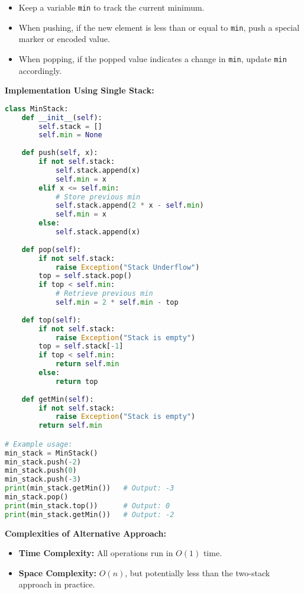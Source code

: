 \begin{itemize}
    \item Keep a variable \texttt{min} to track the current minimum.
    \item When pushing, if the new element is less than or equal to \texttt{min}, push a special marker or encoded value.
    \item When popping, if the popped value indicates a change in \texttt{min}, update \texttt{min} accordingly.
\end{itemize}

\textbf{Implementation Using Single Stack:}

\begin{fullwidth}
\begin{lstlisting}[language=Python]
class MinStack:
    def __init__(self):
        self.stack = []
        self.min = None
    
    def push(self, x):
        if not self.stack:
            self.stack.append(x)
            self.min = x
        elif x <= self.min:
            # Store previous min
            self.stack.append(2 * x - self.min)
            self.min = x
        else:
            self.stack.append(x)
    
    def pop(self):
        if not self.stack:
            raise Exception("Stack Underflow")
        top = self.stack.pop()
        if top < self.min:
            # Retrieve previous min
            self.min = 2 * self.min - top
    
    def top(self):
        if not self.stack:
            raise Exception("Stack is empty")
        top = self.stack[-1]
        if top < self.min:
            return self.min
        else:
            return top
    
    def getMin(self):
        if not self.stack:
            raise Exception("Stack is empty")
        return self.min

# Example usage:
min_stack = MinStack()
min_stack.push(-2)
min_stack.push(0)
min_stack.push(-3)
print(min_stack.getMin())   # Output: -3
min_stack.pop()
print(min_stack.top())      # Output: 0
print(min_stack.getMin())   # Output: -2
\end{lstlisting}
\end{fullwidth}

\textbf{Complexities of Alternative Approach:}

\begin{itemize}
    \item \textbf{Time Complexity:} All operations run in \(O(1)\) time.
    \item \textbf{Space Complexity:} \(O(n)\), but potentially less than the two-stack approach in practice.
\end{itemize}


